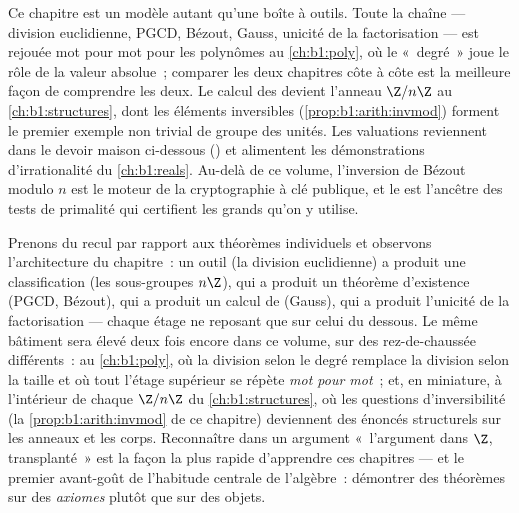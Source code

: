 \begin{remark}\label{rem:b1:arith:whereused}
Ce chapitre est un modèle autant qu'une boîte à outils. Toute la chaîne
--- division euclidienne, PGCD, Bézout, Gauss, unicité de la
factorisation --- est rejouée mot pour mot pour les polynômes au
\cref{ch:b1:poly}, où le «~degré~» joue le rôle de la valeur absolue~;
comparer les deux chapitres côte à côte est la meilleure façon de
comprendre les deux. Le calcul des  devient l'anneau $\Z/n\Z$ au
\cref{ch:b1:structures}, dont les éléments inversibles
(\cref{prop:b1:arith:invmod}) forment le premier exemple non trivial de
groupe des unités. Les valuations reviennent dans le devoir maison ci-dessous
() et alimentent les démonstrations d'irrationalité du
\cref{ch:b1:reals}. Au-delà de ce volume, l'inversion de Bézout modulo $n$
est le moteur de la cryptographie à clé publique, et le  est l'ancêtre des tests de primalité qui certifient les
grands  qu'on y utilise.
\end{remark}

\begin{remark}\label{rem:b1:arith:interlude}
Prenons du recul par rapport aux théorèmes individuels et observons
l'architecture du chapitre~: un outil (la division euclidienne)
a produit une classification (les sous-groupes $n\Z$), qui a produit un
théorème d'existence (PGCD, Bézout), qui a produit un calcul de
 (Gauss), qui a produit l'unicité de la factorisation --- chaque
étage ne reposant que sur celui du dessous. Le même bâtiment sera
élevé deux fois encore dans ce volume, sur des rez-de-chaussée différents~:
au \cref{ch:b1:poly}, où la division selon le degré remplace la division
selon la taille et où tout l'étage supérieur se répète \emph{mot pour mot}~; et, en
miniature, à l'intérieur de chaque $\Z/n\Z$ du \cref{ch:b1:structures},
où les questions d'inversibilité (la \cref{prop:b1:arith:invmod} de ce
chapitre) deviennent des énoncés structurels sur les
anneaux et les corps. Reconnaître dans un argument «~l'argument dans $\Z$,
transplanté~» est la façon la plus rapide d'apprendre ces chapitres --- et
le premier avant-goût de l'habitude centrale de l'algèbre~: démontrer des théorèmes sur des
\emph{axiomes} plutôt que sur des objets.
\end{remark}

